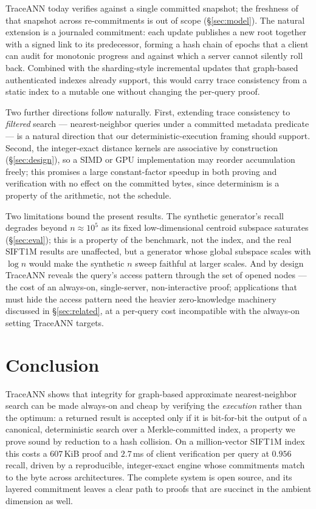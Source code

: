 \documentclass[11pt]{article}
\newcommand{\sys}{TraceANN}
\begin{document}
\sys{} today verifies against a single committed snapshot; the freshness
of that snapshot across re-commitments is out of scope
(\S\ref{sec:model}). The natural extension is a journaled commitment:
each update publishes a new root together with a signed link to its
predecessor, forming a hash chain of epochs that a client can audit for
monotonic progress and against which a server cannot silently roll back.
Combined with the sharding-style incremental updates that graph-based
authenticated indexes already support, this would carry trace
consistency from a static index to a mutable one without changing the
per-query proof.

Two further directions follow naturally. First, extending trace consistency to \emph{filtered} search ---
nearest-neighbor queries under a committed metadata predicate --- is
a natural direction that our deterministic-execution framing should
support. Second, the integer-exact distance kernels are associative by
construction (\S\ref{sec:design}), so a SIMD or GPU implementation may
reorder accumulation freely; this promises a large constant-factor
speedup in both proving and verification with no effect on the committed
bytes, since determinism is a property of the arithmetic, not the
schedule.

Two limitations bound the present results. The synthetic generator's
recall degrades beyond $n\approx10^5$ as its fixed low-dimensional
centroid subspace saturates (\S\ref{sec:eval}); this is a property of
the benchmark, not the index, and the real SIFT1M results are
unaffected, but a generator whose global subspace scales with $\log n$
would make the synthetic $n$ sweep faithful at larger scales. And by
design \sys{} reveals the query's access pattern through the set of
opened nodes --- the cost of an always-on, single-server,
non-interactive proof; applications that must hide the access pattern
need the heavier zero-knowledge machinery discussed in
\S\ref{sec:related}, at a per-query cost incompatible with the always-on
setting \sys{} targets.

\section{Conclusion}\label{sec:conclusion}

\sys{} shows that integrity for graph-based approximate nearest-neighbor
search can be made always-on and cheap by verifying the \emph{execution}
rather than the optimum: a returned result is accepted only if it is
bit-for-bit the output of a canonical, deterministic search over a
Merkle-committed index, a property we prove sound by reduction to a hash
collision. On a million-vector SIFT1M index this costs a $607$\,KiB
proof and $2.7$\,ms of client verification per query at $0.956$ recall,
driven by a reproducible, integer-exact engine whose commitments match
to the byte across architectures. The complete system is open source,
and its layered commitment leaves a clear path to proofs that are
succinct in the ambient dimension as well.



\end{document}
